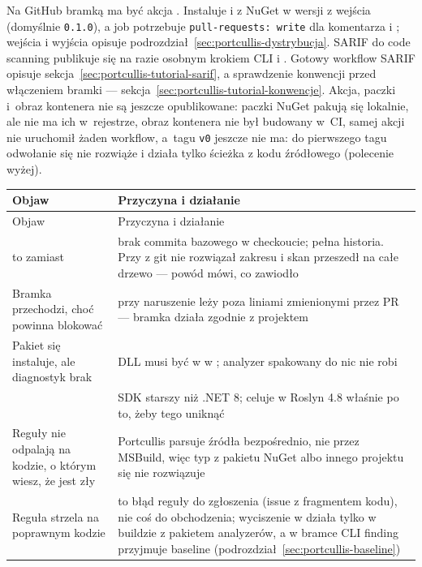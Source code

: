 Na GitHub bramką ma być akcja . Instaluje
 i  z NuGet w wersji z wejścia
 (domyślnie \texttt{0.1.0}), a job potrzebuje \texttt{pull-requests: write}
dla komentarza i ; wejścia i wyjścia opisuje
podrozdział~\ref{sec:portcullis-dystrybucja}. SARIF do code scanning publikuje się na razie
osobnym krokiem CLI i . Gotowy workflow SARIF
opisuje sekcja~\ref{sec:portcullis-tutorial-sarif}, a sprawdzenie konwencji przed włączeniem
bramki --- sekcja~\ref{sec:portcullis-tutorial-konwencje}. Akcja, paczki
i~obraz kontenera nie są jeszcze opublikowane: paczki NuGet pakują się lokalnie, ale nie ma
ich w~rejestrze, obraz kontenera nie był budowany w~CI, samej akcji nie uruchomił żaden
workflow, a~tagu \texttt{v0} jeszcze nie ma: do pierwszego tagu  odwołanie  się nie rozwiąże i działa
tylko ścieżka z kodu źródłowego (polecenie wyżej).

\begin{xltabular}{\linewidth}{@{}>{\raggedright\arraybackslash}p{5.6cm} >{\raggedright\arraybackslash}X@{}}
\toprule
Objaw & Przyczyna i działanie \\
\midrule
\endfirsthead
\toprule
Objaw & Przyczyna i działanie \\
\midrule
\endhead
{} to  zamiast  & brak commita bazowego w checkoucie; pełna historia. Przy  z  git nie rozwiązał zakresu i skan przeszedł na całe drzewo --- powód mówi, co zawiodło \\
Bramka przechodzi, choć powinna blokować & przy  naruszenie leży poza liniami zmienionymi przez PR --- bramka działa zgodnie z projektem \\
Pakiet się instaluje, ale diagnostyk brak & DLL musi być w  w ; analyzer spakowany do  nic nie robi \\
 & SDK starszy niż .NET 8;  celuje w Roslyn 4.8 właśnie po to, żeby tego uniknąć \\
Reguły nie odpalają na kodzie, o którym wiesz, że jest zły & Portcullis parsuje źródła bezpośrednio, nie przez MSBuild, więc typ z pakietu NuGet albo innego projektu się nie rozwiązuje \\
Reguła strzela na poprawnym kodzie & to błąd reguły do zgłoszenia (issue z fragmentem kodu), nie coś do obchodzenia; wyciszenie w  działa tylko w buildzie z pakietem analyzerów, a w bramce CLI finding przyjmuje baseline (podrozdział~\ref{sec:portcullis-baseline}) \\
\bottomrule
\end{xltabular}

